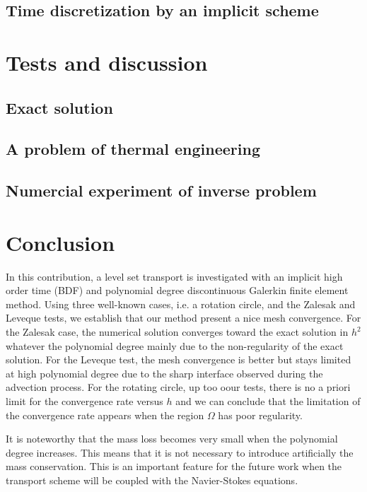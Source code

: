 \documentclass[notitlepage,a4paper,fleqn,9pt]{icmfarticle}
\begin{document}
\begin{multicols}{2}
\subsection{Time discretization by an implicit scheme}
\section{Tests and discussion}
\subsection{Exact solution}
\subsection{A problem of thermal engineering}
\subsection{Numercial experiment of inverse problem}
\section{Conclusion}

In this contribution, a level set transport is investigated with an implicit high order time (BDF) and polynomial degree discontinuous Galerkin finite element method. Using three well-known cases, i.e. a rotation circle, and the Zalesak and Leveque tests, we establish that our method present a nice mesh convergence. For the Zalesak case, the numerical solution converges toward the exact solution in $h^2$ whatever the polynomial degree mainly due to the non-regularity of the exact solution. For the Leveque test, the mesh convergence is better but stays limited at high polynomial degree due to the sharp interface observed during the advection process.
For the rotating circle, up too oour tests, there is no a priori limit for the convergence rate versus $h$
and we can conclude that the limitation of the convergence rate appears when the region $\Omega$ has poor regularity.

It is noteworthy that the mass loss becomes very small when the polynomial degree increases. This means that it is not necessary to introduce artificially the mass conservation. This is an important feature for the future work when the transport scheme will be coupled with the Navier-Stokes equations.




\vfill
\end{multicols}
\end{document}
